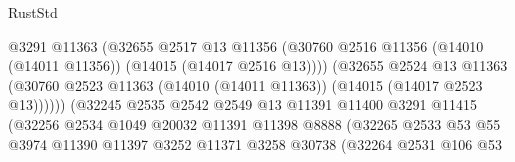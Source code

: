 \begin{lexlean}{RustStd}
\begin{coremodule}
                                          @3291
                                          @11363
                                          (@32655
                                            @2517
                                            @13
                                            @11356
                                            (@30760
                                              @2516
                                              @11356
                                              (@14010 (@14011 @11356))
                                              (@14015 (@14017 @2516 @13))))
                                          (@32655
                                            @2524
                                            @13
                                            @11363
                                            (@30760
                                              @2523
                                              @11363
                                              (@14010 (@14011 @11363))
                                              (@14015 (@14017 @2523 @13))))))
                                      (@32245
                                        @2535
                                        @2542
                                        @2549
                                        @13
                                        @11391
                                        @11400
                                        @3291
                                        @11415
                                        (@32256
                                          @2534
                                          @1049
                                          @20032
                                          @11391
                                          @11398
                                          @8888
                                          (@32265
                                            @2533
                                            @53
                                            @55
                                            @3974
                                            @11390
                                            @11397
                                            @3252
                                            @11371
                                            @3258
                                            @30738
                                            (@32264
                                              @2531
                                              @106
                                              @53

\end{coremodule}
\end{lexlean}
